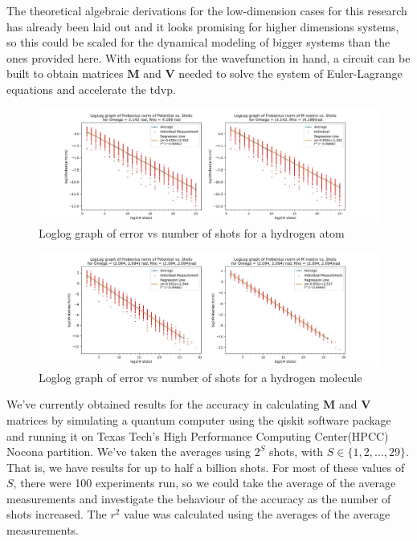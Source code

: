 \documentclass{aux/ttuthes2007}
\begin{document}
The theoretical algebraic derivations for the low-dimension cases for this research has already been laid out and it looks promising for higher dimensions systems, so this could be scaled for the dynamical modeling of bigger systems than the ones provided here.
With equations for the wavefunction in hand, a circuit can be built to obtain matrices $\bm M$ and $\bm V$ needed to solve the system of Euler-Lagrange equations and accelerate the \gls{tdvp}.

\begin{figure}[h!]
	\includegraphics[width=\linewidth]{img/1e.jpg}
  \caption{Loglog graph of error vs number of shots for a hydrogen atom}
  \label{fig:1derrorgraph}
\end{figure}

\begin{figure}[h!]
	\includegraphics[width=\linewidth]{img/2e-nonint.jpg}
  \caption{Loglog graph of error vs number of shots for a hydrogen molecule}
  \label{fig:2derrorgraph}
\end{figure}

We've currently obtained results for the accuracy in calculating $\bm M$ and $\bm V$ matrices by simulating a quantum computer using the qiskit software package and running it on Texas Tech's High Performance Computing Center(HPCC) Nocona partition. We've taken the averages using $2^S$ shots, with $S \in \{1, 2, \ldots, 29\}$. That is, we have results for up to half a billion shots. For most of these values of $S$, there were 100 experiments run, so we could take the average of the average measurements and investigate the behaviour of the accuracy as the number of shots increased. The $r^2$ value was calculated using the averages of the average measurements.
\end{document}
